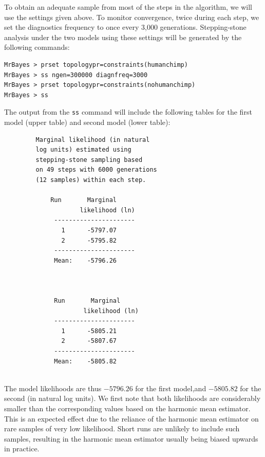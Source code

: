 \documentclass[12pt]{book}
\begin{document}
To obtain an adequate sample from most of the steps in the algorithm, we will use the settings
given above. To monitor convergence, twice during each step, we set the diagnostics frequency to
once every 3,000 generations. Stepping-stone analysis under the two models using these settings
will be generated by the following commands:

\begin{singlespacing}\small
\begin{verbatim}
MrBayes > prset topologypr=constraints(humanchimp)
MrBayes > ss ngen=300000 diagnfreq=3000
MrBayes > prset topologypr=constraints(nohumanchimp)
MrBayes > ss
\end{verbatim}
\end{singlespacing}
\normalsize

The output from the \texttt{ss} command will include the following tables for the first model (upper table) and second model (lower table):~

\begin{figure}\singlespacing\footnotesize
  \vspace{-7mm}
\begin{verbatim}
   Marginal likelihood (in natural
   log units) estimated using 
   stepping-stone sampling based 
   on 49 steps with 6000 generations
   (12 samples) within each step. 

       Run       Marginal 
               likelihood (ln)
        ----------------------
          1      -5797.07   
          2      -5795.82   
        ----------------------
        Mean:    -5796.26



        Run       Marginal 
                likelihood (ln)
        ----------------------
          1      -5805.21   
          2      -5807.67   
        ----------------------
        Mean:    -5805.82


\end{verbatim}\end{figure}

The model likelihoods are thus $-5796.26$ for the first model,and $-5805.82$ for the second (in
natural log units). We first note that both likelihoods are considerably smaller than the
corresponding values based on the harmonic mean estimator. This is an expected effect due to the
reliance of the harmonic mean estimator on rare samples of very low likelihood. Short runs are
unlikely to include such samples, resulting in the harmonic mean estimator usually being biased
upwards in practice.
\end{document}
